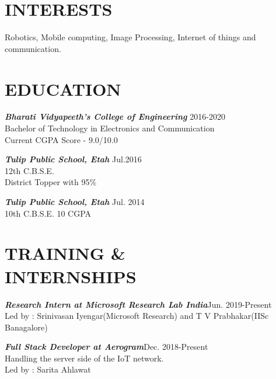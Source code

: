 \documentclass[margin, 10pt]{res} %
\begin{document}
\begin{resume}

 
\section{INTERESTS}  

Robotics, Mobile computing, Image Processing, Internet of things and communication.

\section{EDUCATION} 
{\sl \bf{Bharati Vidyapeeth's College of Engineering}} \hfill 2016-2020\\ Bachelor of Technology in Electronics and Communication\\
Current CGPA Score - 9.0/10.0

{\sl \bf{Tulip Public School, Etah}}
\hfill Jul.2016 \\12th C.B.S.E.  \\District Topper with 95\%

{\sl \bf{Tulip Public School, Etah}}
\hfill Jul. 2014 \\10th C.B.S.E. 10 CGPA\ 


\section{TRAINING \& \\ INTERNSHIPS}

{\sl \bf{Research Intern at Microsoft Research Lab India}}\hfill Jun. 2019-Present\\
Led by : Srinivasan Iyengar(Microsoft Research) and T V Prabhakar(IISc Banagalore)


{\sl \bf{Full Stack Developer at Aerogram}}\hfill Dec. 2018-Present\\
Handling the server side of the IoT network. \\
Led by : Sarita Ahlawat


\end{resume}
\end{document}
